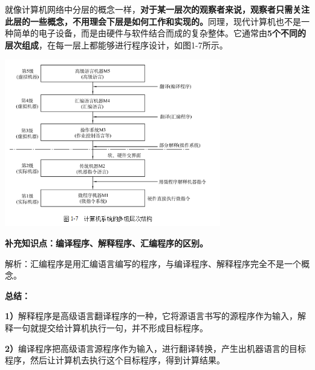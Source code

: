 就像计算机网络中分层的概念一样，\textbf{对于某一层次的观察者来说，观察者只需关注此层的一些概念，不用理会下层是如何工作和实现的。}同理，现代计算机也不是一种简单的电子设备，而是由硬件与软件结合而成的复杂整体。它通常由\textbf{5个不同的层次组成}，在每一层上都能够进行程序设计，如图1-7所示。

\textbf{\includegraphics[width=3.70833in,height=2.86458in]{png-jpeg-pics/CDBD5A691A94AEC34E2EBAA37A85F095.png}}

\textbf{}

\textbf{{补充知识点：编译程序、解释程序、汇编程序的区别。}}

解析：汇编程序是用汇编语言编写的程序，与编译程序、解释程序完全不是一个概念。

\textbf{总结：}

\textbf{1）}解释程序是高级语言翻译程序的一种，它将源语言书写的源程序作为输入，解释一句就提交给计算机执行一句，并不形成目标程序。

\textbf{2）}编译程序把高级语言源程序作为输入，进行翻译转换，产生出机器语言的目标程序，然后让计算机去执行这个目标程序，得到计算结果。
